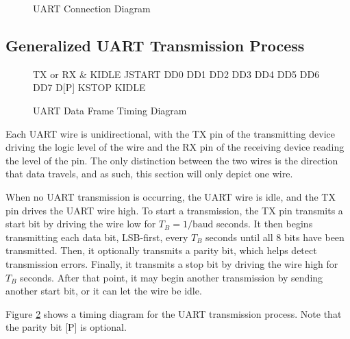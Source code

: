 \begin{figure}[htpb]
	
	\caption{UART Connection Diagram}
	\label{fig:uart-connection-diagram}
\end{figure}



\subsection{Generalized UART Transmission Process}

\begin{figure}[htpb]
	\begin{tikztimingtable}[timing/font=\rmfamily, timing/d/text/.append style={font=\rmfamily}, xscale=3.5, yscale=2, timing/slope=0.2, timing/dslope=0.2, timing/d/background/.style={fill=white},
		timing/metachar={{K}[2]{#1H !{++(-.5\xunit + 0.5*\slope\xunit, -.5\yunit)} N[rectangle,scale=.6]{#2} !{++(.5\xunit - 0.5*\slope\xunit, +.5\yunit)}}},
		timing/metachar={{J}[2]{#1L !{++(-.5\xunit + 0.5*\slope\xunit, +.5\yunit)} N[rectangle,scale=.6]{#2} !{++(.5\xunit - 0.5*\slope\xunit, -.5\yunit)}}},]
		TX or RX & K{IDLE} J{START} D{D0} D{D1} D{D2} D{D3} D{D4} D{D5} D{D6} D{D7} D{\textrm{[P]}} K{STOP} K{IDLE} \\
	\end{tikztimingtable}
	\caption{UART Data Frame Timing Diagram}
	\label{fig:uart-timing-diagram}
\end{figure}

Each UART wire is unidirectional, with the TX pin of the transmitting device driving the logic level of the wire and the RX pin of the receiving device reading the level of the pin. The only distinction between the two wires is the direction that data travels, and as such, this section will only depict one wire.

When no UART transmission is occurring, the UART wire is idle, and the TX pin drives the UART wire high. To start a transmission, the TX pin transmits a start bit by driving the wire low for $T_B = 1 / \textrm{baud}$ seconds. It then begins transmitting each data bit, LSB-first, every $T_B$ seconds until all 8 bits have been transmitted. Then, it optionally transmits a parity bit, which helps detect transmission errors. Finally, it transmits a stop bit by driving the wire high for $T_B$ seconds. After that point, it may begin another transmission by sending another start bit, or it can let the wire be idle.

Figure \ref{fig:uart-timing-diagram} shows a timing diagram for the UART transmission process. Note that the parity bit [P] is optional.



